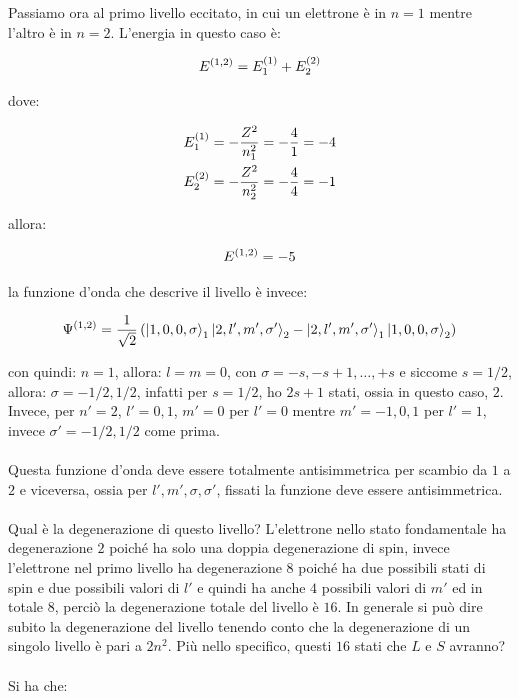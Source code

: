 \begin{itemize}
		Passiamo ora al primo livello eccitato, in cui un elettrone è in $n = 1$ mentre l'altro è in $n = 2$. L'energia in questo caso è:
		
	\begin{align*}
		E^{\qty(1, 2)} = E_1^{\qty(1)} + E_2^{\qty(2)}
	\end{align*}
	
		dove:
		
	\begin{align*}
		& E_1^{\qty(1)} = - \frac{Z^2}{n_1^2} = -\frac{4}{1} = - 4 \\
		& E_2^{\qty(2)} = - \frac{Z^2}{n_2^2} = - \frac{4}{4} = -1
	\end{align*}
	
		allora:
		
	\begin{align*}
		E^{\qty(1, 2)} = - 5
	\end{align*}

		la funzione d'onda che descrive il livello è invece:
		
	\begin{align*}
		\Psi^{\qty(1, 2)} = \frac{1}{\sqrt{2}} \, \qty(\ket{1, 0, 0, \sigma}_1 \ket{2, l', m', \sigma'}_2 - \ket{2, l', m', \sigma'}_1 \ket{1, 0, 0, \sigma}_2)
	\end{align*}

		con quindi: $ n = 1$, allora: $l = m = 0$, con $\sigma = - s, -s +1, \dots, + s$ e siccome $s = 1/2$, allora: $\sigma = -1/2, 1/2$, infatti per $s  =1/2 $, ho $2s +1$ stati, ossia in questo caso, $2$. Invece, per $ n' = 2$, $ l' = 0, 1$, $m' = 0$ per $l' = 0$ mentre $m' = -1, 0, 1$ per $l' = 1$, invece $\sigma' = -1/2, 1/2$ come prima.
		\\
		\\
		Questa funzione d'onda deve essere totalmente antisimmetrica per scambio da $1$ a $2$ e viceversa, ossia per $l', m', \sigma, \sigma'$, fissati la funzione deve essere antisimmetrica. 
		\\
		\\
		Qual è la degenerazione di questo livello? L'elettrone nello stato fondamentale ha degenerazione $2$ poiché ha solo una doppia degenerazione di spin, invece l'elettrone nel primo livello ha degenerazione $8$ poiché ha due possibili stati di spin e due possibili valori di $l'$ e quindi ha anche $4$ possibili valori di $m'$ ed in totale $8$, perciò la degenerazione totale del livello è $16$. In generale si può dire subito la degenerazione del livello tenendo conto che la degenerazione di un singolo livello è pari a $2n^2$. Più nello specifico, questi $16$ stati che $L$ e $S$ avranno?
		\\
		\\
		Si ha che:
	

\end{itemize}
